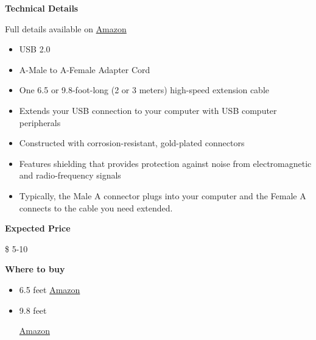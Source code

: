 \begin{gram}
\label{grm:accessories::usbextend}
\textbf{Technical Details}

Full details available on \href{https://www.amazon.com/AmazonBasics-Extension-Cable-Male-Female/dp/B00NH11PEY/ref=sr_1_3?crid=37GCZPQHYO54W&keywords=usb+extension+cable&qid=1582900847&s=electronics&sprefix=usb+ext,electronics,164&sr=1-3}{Amazon}

\begin{itemize}
\item USB 2.0
\item A-Male to A-Female Adapter Cord
\item  One 6.5 or 9.8-foot-long (2 or 3 meters) high-speed extension cable
\item Extends your USB connection to your computer with USB computer peripherals
\item 
Constructed with corrosion-resistant, gold-plated connectors
\item Features shielding that provides protection against noise from electromagnetic and radio-frequency signals
\item Typically, the Male A connector plugs into your computer and the Female A connects to the cable you need extended. 

\end{itemize}

\textbf{Expected Price}

\$ 5-10

\textbf{Where to buy}

\begin{itemize}
\item 
6.5 feet
\href{https://www.amazon.com/AmazonBasics-Extension-Cable-Male-Female/dp/B00NH136G}{Amazon}

\item
9.8 feet

\href{https://www.amazon.com/AmazonBasics-Extension-Cable-Male-Female/dp/B00NH11PEY/ref=sr_1_3?crid=37GCZPQHYO54W&keywords=usb+extension+cable&qid=1582900847&s=electronics&sprefix=usb+ext,electronics,164&sr=1-3}{Amazon}
\end{itemize}
\end{gram}

